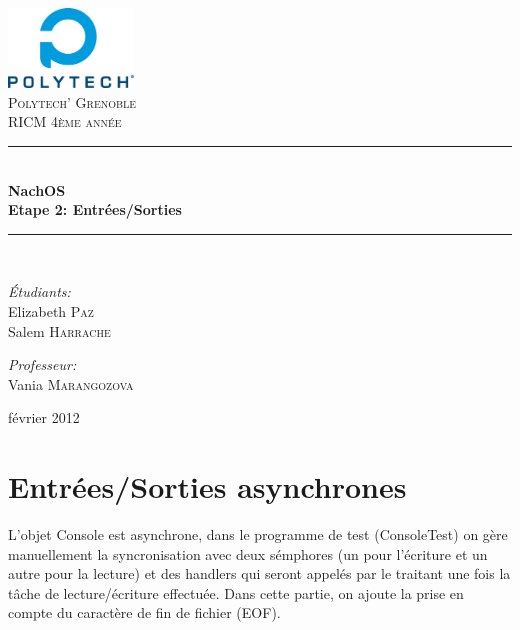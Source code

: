 \documentclass[a4paper,10pt]{article}
\newcommand{\HRule}{\rule{\linewidth}{0.5mm}}
\begin{document}
\begin{titlepage}

\begin{center}


\includegraphics[width=0.25\textwidth]{./images/logo}\\[1cm]

\textsc{\LARGE Polytech' Grenoble}\\[1.5cm]

\textsc{\Large RICM 4\`eme ann\'ee}\\[1.2cm]


\HRule \\[0.4cm]
{ \huge \bfseries NachOS\\[0.6cm]
Etape 2: Entrées/Sorties}
\\[0.4cm]

\HRule \\[2cm]

\begin{minipage}{0.4\textwidth}
\begin{flushleft} \large
\emph{\'Etudiants:}\\
Elizabeth \textsc{Paz} \\
Salem \textsc{Harrache}
\end{flushleft}
\end{minipage}
\begin{minipage}{0.4\textwidth}
\begin{flushright} \large
\emph{Professeur:} \\
Vania \textsc{Marangozova}
\end{flushright}
\end{minipage}

\vfill

{\large  février 2012}

\end{center}

\end{titlepage}

\section{Entrées/Sorties asynchrones}

L'objet Console est asynchrone, dans le programme de test (ConsoleTest) on
gère manuellement la syncronisation avec deux sémphores (un pour l'écriture et
un autre pour la lecture) et des handlers qui seront appelés par le traitant
une fois la tâche de lecture/écriture effectuée. Dans cette partie, on ajoute la
prise en compte du caractère de fin de fichier (EOF).
\end{document}
